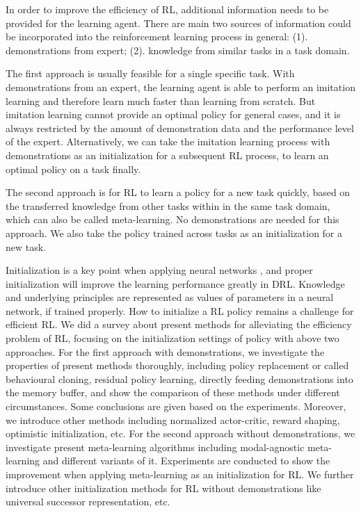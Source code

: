 \documentclass{article}
\begin{document}
In order to improve the efficiency of RL, additional information needs to be provided for the learning agent. There are main two sources of information could be incorporated into the reinforcement learning process in general: (1). demonstrations from expert; (2). knowledge from similar tasks in a task domain. 

The first approach is usually feasible for a single specific task. With demonstrations from an expert, the learning agent is able to perform an imitation learning and therefore learn much faster than learning from scratch. But imitation learning cannot provide an optimal policy for general cases, and it is always restricted by the amount of demonstration data and the performance level of the expert. Alternatively, we can take the imitation learning process with demonstrations as an initialization for a subsequent RL process, to learn an optimal policy on a task finally.

The second approach is for RL to learn a policy for a new task quickly, based on the transferred knowledge from other tasks within in the same task domain, which can also be called meta-learning. No demonstrations are needed for this approach. We also take the policy trained across tasks as an initialization for a new task.

Initialization is a key point when applying neural networks \cite{glorot2010understanding}, and proper initialization will improve the learning performance greatly in DRL. Knowledge and underlying principles are represented as values of parameters in a neural network, if trained properly. How to initialize a RL policy remains a challenge for efficient RL. We did a survey about present methods for alleviating the efficiency problem of RL, focusing on the initialization settings of policy with above two approaches. For the first approach with demonstrations, we investigate the properties of present methods thoroughly, including policy replacement or called behavioural cloning, residual policy learning, directly feeding demonstrations into the memory buffer, and show the comparison of these methods under different circumstances. Some conclusions are given based on the experiments. Moreover, we introduce other methods including normalized actor-critic, reward shaping, optimistic initialization, etc. For the second approach without demonstrations, we investigate present meta-learning algorithms including modal-agnostic meta-learning and different variants of it. Experiments are conducted to show the improvement when applying meta-learning as an initialization for RL. We further introduce other initialization methods for RL without demonstrations like universal successor representation, etc.
\end{document}
